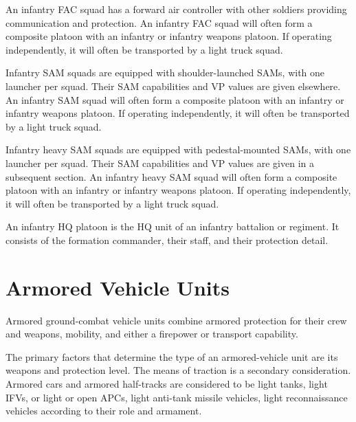 An infantry FAC squad has a forward air controller with other soldiers providing communication and protection.
An infantry FAC squad will often form a composite platoon with an infantry or infantry weapons platoon. If operating independently, it will often be transported by a light truck squad.


Infantry SAM squads are equipped with shoulder-launched SAMs, with one launcher per squad. Their SAM capabilities and VP values are given elsewhere.
An infantry SAM squad will often form a composite platoon with an infantry or infantry weapons platoon.
If operating independently, it will often be transported by a light truck squad.


Infantry heavy SAM squads are equipped with pedestal-mounted SAMs, with one launcher per squad. Their SAM capabilities and VP values are given in a subsequent section.
An infantry heavy SAM squad will often form a composite platoon with an infantry or infantry weapons platoon. If operating independently, it will often be transported by a light truck squad.


An infantry HQ platoon is the HQ unit of an infantry battalion or regiment. It consists of the formation commander, their staff, and their protection detail.%

\section{Armored Vehicle Units}

Armored ground-combat vehicle units combine armored protection for their crew and weapons, mobility, and either a firepower or transport capability.

The primary factors that determine the type of an armored-vehicle unit are its weapons and protection level. The means of traction is a secondary consideration. Armored cars and armored half-tracks are considered to be light tanks, light IFVs, or light or open APCs, light anti-tank missile vehicles, light reconnaissance vehicles according to their role and armament.

